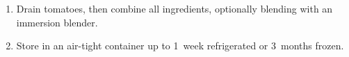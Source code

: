 \label{tomato.sauce}

\begin{ingredients}
\end{ingredients}


\begin{recipe}
  \begin{enumerate}

  \item Drain tomatoes, then combine all ingredients, optionally
    blending with an immersion blender.

  \item Store in an air-tight container up to 1~week refrigerated or
    3~months frozen.

  \end{enumerate}
\end{recipe}

